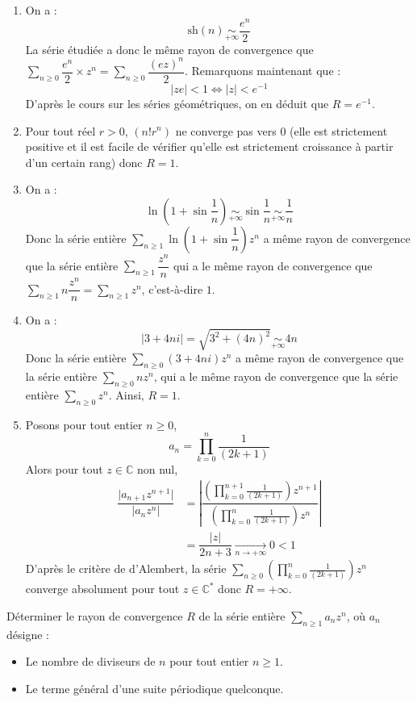\documentclass[a4paper,twoside,french,11pt]{VcCours}
\newcommand{\Sum}[2]{\sum_{#1}^{#2}}
\begin{document}
\begin{enumerate}
\item  On a :
$$\textrm{sh}(n) \underset{+ \infty}{\sim} \dfrac{e^n}{2}$$
La série étudiée a donc le même rayon de convergence que $\Sum{n \geq 0}{}  \dfrac{e^n}{2} \times z^n = \Sum{n \geq 0}{}  \dfrac{(ez)^n}{2}$. Remarquons maintenant que :
$$ \vert ze \vert < 1 \Longleftrightarrow \vert z \vert < e^{-1}$$
D'après le cours sur les séries géométriques, on en déduit que $R=e^{-1}$.
\item Pour tout réel $r>0$, $(n!r^n)$ ne converge pas vers $0$ (elle est strictement positive et il est facile de vérifier qu'elle est strictement croissance à partir d'un certain rang) donc $R=1$.
\item On a :
\[
\ln\left(1+\sin\dfrac{1}{n}\right)\underset{+\infty}{\sim}\sin\dfrac{1}{n}\underset{+\infty}{\sim}\dfrac{1}{n}
\]
Donc la série entière $\Sum{n \geq 1}{}\ln\left(1+\sin\dfrac{1}{n}\right)z^n$ a même rayon de convergence que la série entière $\Sum{n \geq 1}{} \dfrac{z^n}{n}$ qui a le même rayon de convergence que $\Sum{n \geq 1}{} n\dfrac{z^n}{n} = \Sum{n \geq 1}{} z^n$, c'est-à-dire $1$.
\item On a :
\[
\vert 3+4ni\vert=\sqrt{3^2+(4n)^2}\underset{+\infty}{\sim}4n
\]
Donc la série entière $\Sum{n \geq 0}{} (3+4ni)z^n$ a même rayon de convergence que la série entière $\Sum{n \geq 0}{} nz^n$, qui a le même rayon de convergence que la série entière $\Sum{n \geq 0}{} z^n$. Ainsi, $R=1$.
\item Posons pour tout entier $n \geq 0$,
$$a_n = \prod_{k=0}^n\dfrac{1}{(2k+1)} $$
Alors pour tout $z \in \mathbb{C}$ non nul, 
\begin{align*}
\dfrac{\vert a_{n+1} z^{n+1} \vert }{\vert a_n z^n \vert} & =\left\vert\dfrac{\left(\prod_{k=0}^{n+1}\frac{1}{(2k+1)}\right)z^{n+1}}{\left(\prod_{k=0}^n\frac{1}{(2k+1)}\right)z^n}\right\vert \\
& =\dfrac{\vert z\vert }{2n+3}\underset{n \rightarrow +\infty}{\longrightarrow}0<1
\end{align*}
D'après le critère de d'Alembert, la série $\Sum{n \geq 0}{} \left(\prod_{k=0}^n\frac{1}{(2k+1)}\right)z^n$ converge absolument pour tout $z\in\mathbb{C}^*$ donc $R=+\infty$. 
\end{enumerate}

\begin{Exercice}{} Déterminer le rayon de convergence $R$ de la série entière $\Sum{n\geq 1}{} a_n z^n$, où $a_n$ désigne : 
\begin{itemize}
\item Le nombre de diviseurs de $n$ pour tout entier $n\geq 1$.
\item Le terme général d'une suite périodique quelconque. 
\end{itemize}
\end{Exercice}
\end{document}
